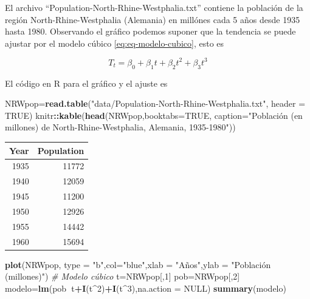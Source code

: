 \documentclass[12pt,]{krantz}
\makeatletter
\newenvironment{Shaded}{\begin{snugshade}}{\end{snugshade}}
\newcommand{\KeywordTok}[1]{\textcolor[rgb]{0.13,0.29,0.53}{\textbf{#1}}}
\newcommand{\DataTypeTok}[1]{\textcolor[rgb]{0.13,0.29,0.53}{#1}}
\newcommand{\DecValTok}[1]{\textcolor[rgb]{0.00,0.00,0.81}{#1}}
\newcommand{\StringTok}[1]{\textcolor[rgb]{0.31,0.60,0.02}{#1}}
\newcommand{\CommentTok}[1]{\textcolor[rgb]{0.56,0.35,0.01}{\textit{#1}}}
\newcommand{\OtherTok}[1]{\textcolor[rgb]{0.56,0.35,0.01}{#1}}
\newcommand{\OperatorTok}[1]{\textcolor[rgb]{0.81,0.36,0.00}{\textbf{#1}}}
\newcommand{\NormalTok}[1]{#1}
\newenvironment{kframe}{%
\medskip{}
\setlength{\fboxsep}{.8em}
 \def\at@end@of@kframe{}%
 \ifinner\ifhmode%
  \def\at@end@of@kframe{\end{minipage}}%
  \begin{minipage}{\columnwidth}%
 \fi\fi%
 \def\FrameCommand##1{\hskip\@totalleftmargin \hskip-\fboxsep
 \colorbox{shadecolor}{##1}\hskip-\fboxsep
     \hskip-\linewidth \hskip-\@totalleftmargin \hskip\columnwidth}%
 \MakeFramed {\advance\hsize-\width
   \@totalleftmargin\z@ \linewidth\hsize
   \@setminipage}}%
 {\par\unskip\endMakeFramed%
 \at@end@of@kframe}
\renewenvironment{Shaded}{\begin{kframe}}{\end{kframe}}
\theoremstyle{definition}
\theoremstyle{definition}
\theoremstyle{definition}
\theoremstyle{remark}
\let\BeginKnitrBlock\begin \let\EndKnitrBlock\end
\makeatother
\begin{document}
\BeginKnitrBlock{example}
\protect\hypertarget{exm:ejemplo-poblacion-alemania-T1}{}{\label{exm:ejemplo-poblacion-alemania-T1}
}El archivo ``Population-North-Rhine-Westphalia.txt'' contiene la
población de la región North-Rhine-Westphalia (Alemania) en millónes
cada 5 años desde 1935 hasta 1980. Observando el gráfico podemos suponer
que la tendencia se puede ajustar por el modelo cúbico
\eqref{eq:eq-modelo-cubico}, esto es
\EndKnitrBlock{example}

\[T_t=\beta_0+\beta_1t+\beta_2t^2+\beta_3t^3\]

El código en R para el gráfico y el ajuste es

\begin{Shaded}
\begin{Highlighting}[]
\NormalTok{NRWpop=}\KeywordTok{read.table}\NormalTok{(}\StringTok{"data/Population-North-Rhine-Westphalia.txt"}\NormalTok{,}
                     \DataTypeTok{header =} \OtherTok{TRUE}\NormalTok{)}
\NormalTok{knitr}\OperatorTok{::}\KeywordTok{kable}\NormalTok{(}\KeywordTok{head}\NormalTok{(NRWpop,}\DataTypeTok{booktabs=}\OtherTok{TRUE}\NormalTok{,}
                  \DataTypeTok{caption=}\StringTok{"Población (en millones) de North-Rhine-Westphalia, Alemania, 1935-1980"}\NormalTok{))}
\end{Highlighting}
\end{Shaded}

\begin{tabular}{r|r}
\hline
Year & Population\\
\hline
1935 & 11772\\
\hline
1940 & 12059\\
\hline
1945 & 11200\\
\hline
1950 & 12926\\
\hline
1955 & 14442\\
\hline
1960 & 15694\\
\hline
\end{tabular}

\begin{Shaded}
\begin{Highlighting}[]
\KeywordTok{plot}\NormalTok{(NRWpop, }\DataTypeTok{type =} \StringTok{"b"}\NormalTok{,}\DataTypeTok{col=}\StringTok{"blue"}\NormalTok{,}\DataTypeTok{xlab =} \StringTok{"Años"}\NormalTok{,}\DataTypeTok{ylab =} \StringTok{"Población (millones)"}\NormalTok{)}
\CommentTok{# Modelo cúbico}
\NormalTok{t=NRWpop[,}\DecValTok{1}\NormalTok{]}
\NormalTok{pob=NRWpop[,}\DecValTok{2}\NormalTok{]}
\NormalTok{modelo=}\KeywordTok{lm}\NormalTok{(pob}\OperatorTok{~}\NormalTok{t}\OperatorTok{+}\KeywordTok{I}\NormalTok{(t}\OperatorTok{^}\DecValTok{2}\NormalTok{)}\OperatorTok{+}\KeywordTok{I}\NormalTok{(t}\OperatorTok{^}\DecValTok{3}\NormalTok{),}\DataTypeTok{na.action =} \OtherTok{NULL}\NormalTok{)}
\KeywordTok{summary}\NormalTok{(modelo)}
\end{Highlighting}
\end{Shaded}
\end{document}
